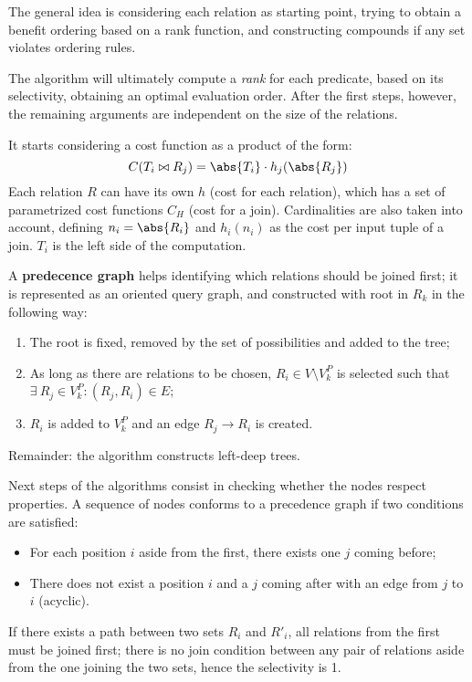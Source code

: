 The general idea is considering each relation as starting point, trying to obtain a benefit ordering based on a rank function, and constructing compounds if any set violates ordering rules.

The algorithm will ultimately compute a \textit{rank} for each predicate, based on its selectivity, obtaining an optimal evaluation order. After the first steps, however, the remaining arguments are independent on the size of the relations.

It starts considering a cost function as a product of the form:
$$C(T_i \bowtie R_j) = \abs{T_i} \cdot h_j(\abs{R_j})$$
Each relation $R$ can have its own $h$ (cost for each relation), which has a set of parametrized cost functions $C_H$ (cost for a join). Cardinalities are also taken into account, defining $n_i = \abs{R_i}$ and $h_i(n_i)$ as the cost per input tuple of a join. $T_i$ is the left side of the computation.

A \textbf{predecence graph} helps identifying which relations should be joined first; it is represented as an oriented query graph, and constructed with root in $R_k$ in the following way:
\begin{enumerate}
	\item The root is fixed, removed by the set of possibilities and added to the tree;
	\item As long as there are relations to be chosen, $R_i \in V \setminus V_k^P$ is selected such that $\exists\ R_j \in V_k^P : (R_j, R_i) \in E$;
	\item $R_i$ is added to $V_k^P$ and an edge $R_j \rightarrow R_i$ is created.
\end{enumerate}

Remainder: the algorithm constructs left-deep trees.

Next steps of the algorithms consist in checking whether the nodes respect properties. A sequence of nodes conforms to a precedence graph if two conditions are satisfied:
\begin{itemize}
	\item For each position $i$ aside from the first, there exists one $j$ coming before;
	\item There does not exist a position $i$ and a $j$ coming after with an edge from $j$ to $i$ (acyclic).
\end{itemize}

If there exists a path between two sets $R_i$ and $R'_i$, all relations from the first must be joined first; there is no join condition between any pair of relations aside from the one joining the two sets, hence the selectivity is 1.

